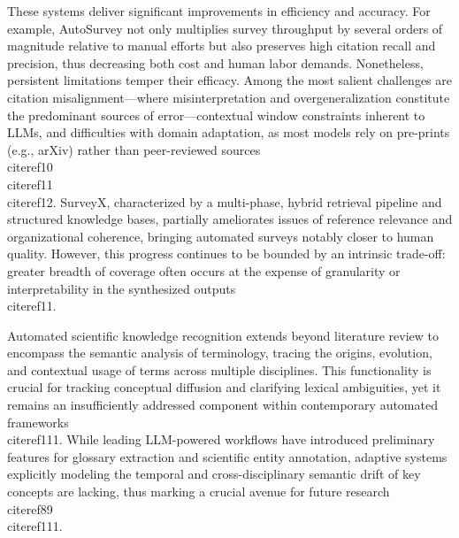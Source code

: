 \documentclass[11pt]{article}
\begin{document}
These systems deliver significant improvements in efficiency and accuracy. For example, AutoSurvey not only multiplies survey throughput by several orders of magnitude relative to manual efforts but also preserves high citation recall and precision, thus decreasing both cost and human labor demands. Nonetheless, persistent limitations temper their efficacy. Among the most salient challenges are citation misalignment—where misinterpretation and overgeneralization constitute the predominant sources of error—contextual window constraints inherent to LLMs, and difficulties with domain adaptation, as most models rely on pre-prints (e.g., arXiv) rather than peer-reviewed sources \\cite{ref10}\\cite{ref11}\\cite{ref12}. SurveyX, characterized by a multi-phase, hybrid retrieval pipeline and structured knowledge bases, partially ameliorates issues of reference relevance and organizational coherence, bringing automated surveys notably closer to human quality. However, this progress continues to be bounded by an intrinsic trade-off: greater breadth of coverage often occurs at the expense of granularity or interpretability in the synthesized outputs \\cite{ref11}.

Automated scientific knowledge recognition extends beyond literature review to encompass the semantic analysis of terminology, tracing the origins, evolution, and contextual usage of terms across multiple disciplines. This functionality is crucial for tracking conceptual diffusion and clarifying lexical ambiguities, yet it remains an insufficiently addressed component within contemporary automated frameworks \\cite{ref111}. While leading LLM-powered workflows have introduced preliminary features for glossary extraction and scientific entity annotation, adaptive systems explicitly modeling the temporal and cross-disciplinary semantic drift of key concepts are lacking, thus marking a crucial avenue for future research \\cite{ref89}\\cite{ref111}.
\end{document}
